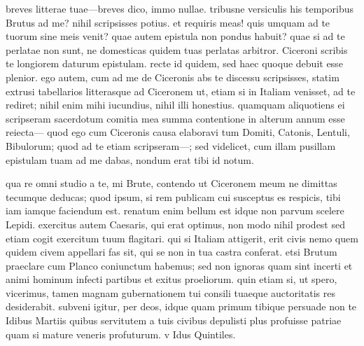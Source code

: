 


 breves litterae tuae—breves dico, immo nullae. tribusne versiculis his temporibus Brutus ad me? nihil scripsisses potius. et requiris meas! quis umquam ad te tuorum sine meis venit? quae autem epistula non pondus habuit? quae si ad te perlatae non sunt, ne domesticas quidem tuas perlatas arbitror. Ciceroni scribis te longiorem daturum epistulam. recte id quidem, sed haec quoque debuit esse plenior. ego autem, cum ad me de Ciceronis abs te discessu scripsisses, statim extrusi tabellarios litterasque ad Ciceronem ut, etiam si in Italiam venisset, ad te rediret; nihil enim mihi iucundius, nihil illi honestius. quamquam aliquotiens ei scripseram sacerdotum comitia mea summa contentione in alterum annum esse reiecta— quod ego cum Ciceronis causa elaboravi tum Domiti, Catonis, Lentuli, Bibulorum; quod ad te etiam scripseram—; sed videlicet, cum illam pusillam epistulam tuam ad me dabas, nondum erat tibi id notum.

 qua re omni studio a te, mi Brute, contendo ut Ciceronem meum ne dimittas tecumque deducas; quod ipsum, si rem publicam cui susceptus es respicis, tibi iam iamque faciendum est. renatum enim bellum est idque non parvum scelere Lepidi. exercitus autem Caesaris, qui erat optimus, non modo nihil prodest sed etiam cogit exercitum tuum flagitari. qui si Italiam attigerit, erit civis nemo quem quidem civem appellari fas sit, qui se non in tua castra conferat. etsi Brutum praeclare cum Planco coniunctum habemus; sed non ignoras quam sint incerti et animi hominum infecti partibus et exitus proeliorum. quin etiam si, ut spero, vicerimus, tamen magnam gubernationem tui consili tuaeque auctoritatis res desiderabit. subveni igitur, per deos, idque quam primum tibique persuade non te Idibus Martiis quibus servitutem a tuis civibus depulisti plus profuisse patriae quam si mature veneris profuturum. v Idus Quintiles.
